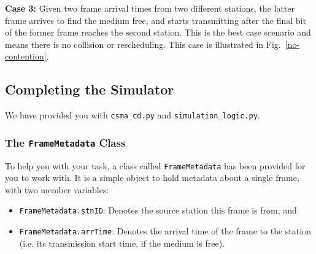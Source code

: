 \documentclass[11pt]{article}
\begin{document}
\textbf{Case 3:} Given two frame arrival times from two different stations, the latter frame arrives to find the medium free, and starts transmitting after the final bit of the former frame reaches the second station.
This is the best case scenario and means there is no collision or rescheduling.
This case is illustrated in Fig.~\ref{no-contention}.




\subsection{Completing the Simulator}
\label{subsec:complete-simulator}
We have provided you with \texttt{csma\_cd.py} and \texttt{simulation\_logic.py}.




\subsubsection{The \texttt{FrameMetadata} Class}
\label{subsubsec:framemetadata}
To help you with your task, a class called \texttt{FrameMetadata} has been provided for you to work with.
It is a simple object to hold metadata about a single frame, with two member variables:
\begin{itemize}
    \item \texttt{FrameMetadata.stnID}: Denotes the source station this frame is from; and
    \item \texttt{FrameMetadata.arrTime}: Denotes the arrival time of the frame to the station (i.e. its transmission start time, if the medium is free).
\end{itemize}
\end{document}
